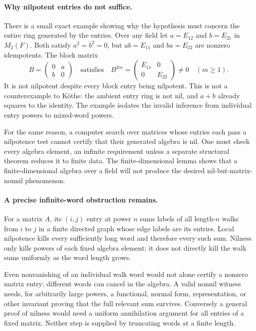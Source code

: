\documentclass[11pt]{article}
\begin{document}
\paragraph{Why nilpotent entries do not suffice.}
There is a small exact example showing why the hypothesis must concern
the entire ring generated by the entries. Over any field let
$a=E_{12}$ and $b=E_{21}$ in $M_2(F)$. Both satisfy $a^2=b^2=0$, but
$ab=E_{11}$ and $ba=E_{22}$ are nonzero idempotents. The block matrix
\[
 B=\begin{pmatrix}0&a\\b&0\end{pmatrix}
 \quad\text{satisfies}\quad
 B^{2m}=\begin{pmatrix}E_{11}&0\\0&E_{22}\end{pmatrix}\ne0
 \quad(m\ge1).
\]
It is not nilpotent despite every block entry being nilpotent. This is
not a counterexample to K\"othe: the ambient entry ring is not nil,
and $a+b$ already squares to the identity. The example isolates the
invalid inference from individual entry powers to mixed-word powers.

For the same reason, a computer search over matrices whose entries each
pass a nilpotence test cannot certify that their generated algebra is nil.
One must check every algebra element, an infinite requirement unless a
separate structural theorem reduces it to finite data. The finite-dimensional
lemma shows that a finite-dimensional algebra over a field will not
produce the desired nil-but-matrix-nonnil phenomenon.

\paragraph{A precise infinite-word obstruction remains.}
For a matrix $A$, its $(i,j)$ entry at power $n$ sums labels of all
length-$n$ walks from $i$ to $j$ in a finite directed graph whose edge
labels are its entries. Local nilpotence kills every sufficiently long
word and therefore every such sum. Nilness only kills powers of each
fixed algebra element; it does not directly kill the walk sums uniformly
as the word length grows.

Even nonvanishing of an individual walk word would not alone certify a
nonzero matrix entry: different words can cancel in the algebra. A valid
nonnil witness needs, for arbitrarily large powers, a functional, normal
form, representation, or other invariant proving that the full relevant
sum survives. Conversely a general proof of nilness would need a uniform
annihilation argument for all entries of a fixed matrix. Neither step is
supplied by truncating words at a finite length.
\end{document}
